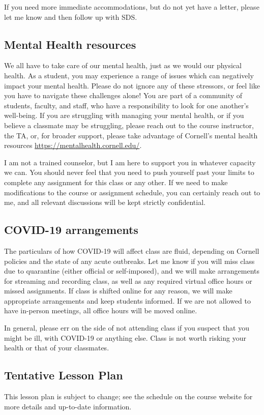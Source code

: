\documentclass[12pt,a4paper]{article}
\begin{document}
If you need more immediate accommodations, but do not yet have a letter, please let me know and then follow up with SDS.

\subsection{Mental Health resources}
We all have to take care of our mental health, just as we would our physical health. As a student, you may experience a range of issues which can negatively impact your mental health. Please do not ignore any of these stressors, or feel like you have to navigate these challenges alone! You are part of a community of students, faculty, and staff, who have a responsibility to look for one another's well-being. If you are struggling with managing your mental health, or if you believe a classmate may be struggling, please reach out to the course instructor, the TA, or, for broader support, please take advantage of Cornell's mental health resources \href{https://mentalhealth.cornell.edu/}{https://mentalhealth.cornell.edu/}.

I am not a trained counselor, but I am here to support you in whatever capacity we can. You should never feel that you need to push yourself past your limits to complete any assignment for this class or any other. If we need to make modifications to the course or assignment schedule, you can certainly reach out to me, and all relevant discussions will be kept strictly confidential.

\subsection{COVID-19 arrangements}
The particulars of how COVID-19 will affect class are fluid, depending on Cornell policies and the state of any acute outbreaks. Let me know if you will miss class due to quarantine (either official or self-imposed), and we will make arrangements for streaming and recording class, as well as any required virtual office hours or missed assignments. If class is shifted online for any reason, we will make appropriate arrangements and keep students informed. If we are not allowed to have in-person meetings, all office hours will be moved online.

In general, please err on the side of not attending class if you suspect that you might be ill, with COVID-19 or anything else. Class is not worth risking your health or that of your classmates.

\subsection{Tentative Lesson Plan}
This lesson plan is subject to change; see the schedule on the course website for more details and up-to-date information.
\end{document}
